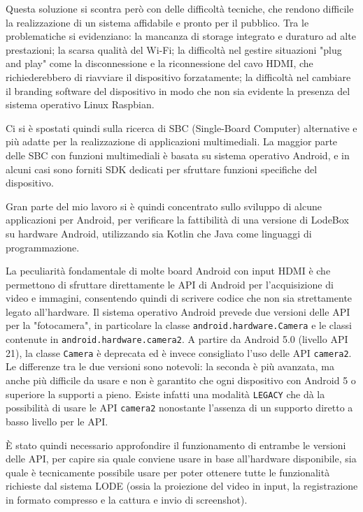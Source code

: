 Questa soluzione si scontra però con delle difficoltà tecniche, che rendono difficile la realizzazione di un sistema affidabile e pronto per il pubblico. Tra le problematiche si evidenziano: la mancanza di storage integrato e duraturo ad alte prestazioni; la scarsa qualità del Wi-Fi; la difficoltà nel gestire situazioni "plug and play" come la disconnessione e la riconnessione del cavo HDMI, che richiederebbero di riavviare il dispositivo forzatamente; la difficoltà nel cambiare il branding software del dispositivo in modo che non sia evidente la presenza del sistema operativo Linux Raspbian.


Ci si è spostati quindi sulla ricerca di SBC (Single-Board Computer) alternative e più adatte per la realizzazione di applicazioni multimediali. La maggior parte delle SBC con funzioni multimediali è basata su sistema operativo Android, e in alcuni casi sono forniti SDK dedicati per sfruttare funzioni specifiche del dispositivo.

Gran parte del mio lavoro si è quindi concentrato sullo sviluppo di alcune applicazioni per Android, per verificare la fattibilità di una versione di LodeBox su hardware Android, utilizzando sia Kotlin che Java come linguaggi di programmazione.

La peculiarità fondamentale di molte board Android con input HDMI è che permettono di sfruttare direttamente le API di Android per l'acquisizione di video e immagini, consentendo quindi di scrivere codice che non sia strettamente legato all'hardware. Il sistema operativo Android prevede due versioni delle API per la "fotocamera", in particolare la classe \texttt{android.hardware.Camera} e le classi contenute in \texttt{android.hardware.camera2}. A partire da Android 5.0 (livello API 21), la classe \texttt{Camera} è deprecata ed è invece consigliato l'uso delle API \texttt{camera2}. Le differenze tra le due versioni sono notevoli: la seconda è più avanzata, ma anche più difficile da usare e non è garantito che ogni dispositivo con Android 5 o superiore la supporti a pieno. Esiste infatti una modalità \texttt{LEGACY} che dà la possibilità di usare le API \texttt{camera2} nonostante l'assenza di un supporto diretto a basso livello per le API.

È stato quindi necessario approfondire il funzionamento di entrambe le versioni delle API, per capire sia quale conviene usare in base all'hardware disponibile, sia quale è tecnicamente possibile usare per poter ottenere tutte le funzionalità richieste dal sistema LODE (ossia la proiezione del video in input, la registrazione in formato compresso e la cattura e invio di screenshot).

